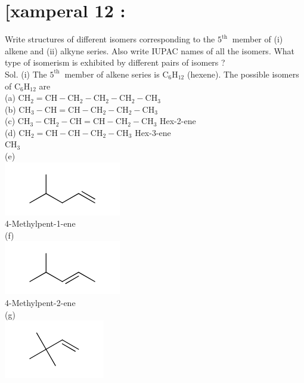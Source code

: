 \documentclass[10pt]{article}
\begin{document}
\section*{[xamperal 12 :}
Write structures of different isomers corresponding to the $5^{\text {th }}$ member of (i) alkene and (ii) alkyne series. Also write IUPAC names of all the isomers. What type of isomerism is exhibited by different pairs of isomers ?\\
Sol. (i) The $5^{\text {th }}$ member of alkene series is $\mathrm{C}_{6} \mathrm{H}_{12}$ (hexene). The possible isomers of $\mathrm{C}_{6} \mathrm{H}_{12}$ are\\
(a) $\mathrm{CH}_{2}=\mathrm{CH}-\mathrm{CH}_{2}-\mathrm{CH}_{2}-\mathrm{CH}_{2}-\mathrm{CH}_{3}$\\
(b) $\mathrm{CH}_{3}-\mathrm{CH}=\mathrm{CH}-\mathrm{CH}_{2}-\mathrm{CH}_{2}-\mathrm{CH}_{3}$\\
(c) $\mathrm{CH}_{3}-\mathrm{CH}_{2}-\mathrm{CH}=\mathrm{CH}-\mathrm{CH}_{2}-\mathrm{CH}_{3}$ Hex-2-ene\\
(d) $\mathrm{CH}_{2}=\mathrm{CH}-\mathrm{CH}-\mathrm{CH}_{2}-\mathrm{CH}_{3}$ Hex-3-ene\\
$\mathrm{CH}_{3}$\\
(e)\\
\includegraphics{smile-a65b4ff77c4cd0e57410b163b63c5ce075dc0a4c}\\
4-Methylpent-1-ene\\
(f)\\
\includegraphics{smile-e7b598697bc684504bf8c0a94a19891d33ebb4b3}\\
4-Methylpent-2-ene\\
(g)\\
\includegraphics{smile-c671e90f4c3fd000a37469b616862f0f9cbf7256}
\end{document}
